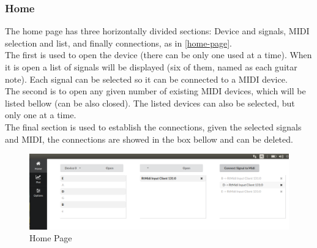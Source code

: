 \subsubsection{Home}
The home page has three horizontally divided sections: Device and signals, MIDI selection
and list, and  finally connections, as in \autoref{home-page}. \\
The first is used to open the device (there can be only one used at a time). When it
is open a list of signals will be displayed (six of them, named as each guitar note).
Each signal can be selected so it can be connected to a MIDI device.\\
The second is to open any given number of existing MIDI devices, which will be listed
bellow (can be also closed). The listed devices can also be selected, but only one at a time. \\
The final section is used to establish the connections, given the selected signals
and MIDI, the connections are showed in the box bellow and can be deleted.
\begin{figure}[htb]
	\caption{Home Page}
  \label{home-page}
	\begin{center}
    \includegraphics[width=0.7\paperwidth]{images/snapshots/home}
	\end{center}
\end{figure}

